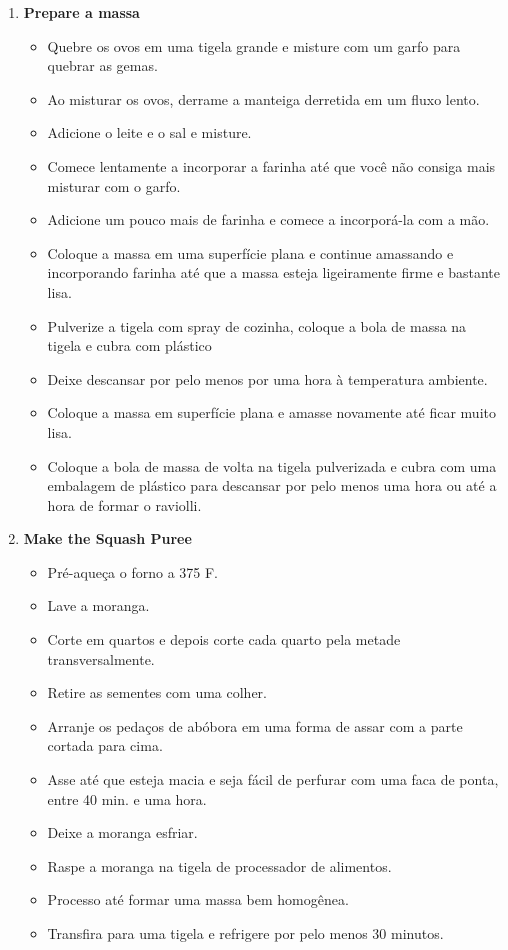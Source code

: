 \documentclass [11pt, letterpaper] {article}
\begin{document}
\begin {description}
\begin {enumerate}
\item {\bf Prepare a massa}
\begin {itemize}
\item Quebre os ovos em uma tigela grande e misture com um garfo para quebrar as gemas.
\item Ao misturar os ovos, derrame a manteiga derretida em um fluxo lento.
\item Adicione o leite e o sal e misture.
\item Comece lentamente a incorporar a farinha até que você não consiga mais misturar com o garfo.
\item Adicione um pouco mais de farinha e comece a incorporá-la com a mão.
\item Coloque a massa em uma superfície plana e continue amassando e incorporando farinha até que a massa esteja ligeiramente firme e bastante lisa.
\item Pulverize a tigela com spray de cozinha, coloque a bola de massa na tigela e cubra com plástico
\item Deixe descansar por pelo menos por uma hora à temperatura ambiente.
\item Coloque a massa em superfície plana e amasse novamente até ficar muito lisa.
\item Coloque a bola de massa de volta na tigela pulverizada e cubra com uma embalagem de plástico para descansar por pelo menos uma hora ou até a hora de formar o raviolli.
\end {itemize}

\item {\bf Make the Squash Puree}
\begin {itemize}
\item Pré-aqueça o forno a 375 F.
\item Lave a moranga.
\item Corte em quartos e depois corte cada quarto pela metade transversalmente.
\item Retire as sementes com uma colher.
\item Arranje os pedaços de abóbora em uma forma de assar com a parte cortada para cima.
\item Asse até que esteja macia e seja f\'acil de perfurar com uma faca de ponta, entre 40 min. e uma hora.
\item Deixe a moranga esfriar.
\item Raspe a moranga na tigela de processador de alimentos.
\item Processo até formar uma massa bem homog\^enea.
\item Transfira para uma tigela e refrigere por pelo menos 30 minutos.
\end {itemize}


\end{enumerate}
\end{description}
\end{document}
